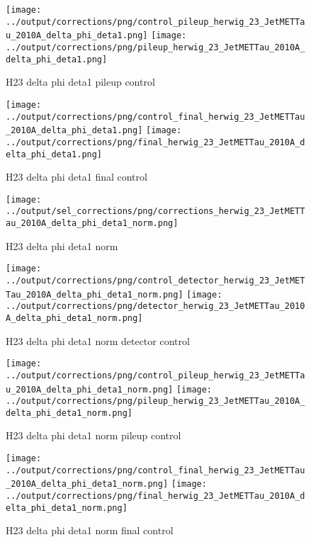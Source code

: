 \documentclass[11pt]{book}
\begin{document}
\begin{figure}[ht]
\centering
\texttt{[image: ../output/corrections/png/control\_pileup\_herwig\_23\_JetMETTau\_2010A\_delta\_phi\_deta1.png]}
\texttt{[image: ../output/corrections/png/pileup\_herwig\_23\_JetMETTau\_2010A\_delta\_phi\_deta1.png]}
\caption{H23 delta phi deta1 pileup control}
\label{fig:H23_JetMETTau_2010A_delta_phi_deta1_pileup_control}
\end{figure}


\begin{figure}[ht]
\centering
\texttt{[image: ../output/corrections/png/control\_final\_herwig\_23\_JetMETTau\_2010A\_delta\_phi\_deta1.png]}
\texttt{[image: ../output/corrections/png/final\_herwig\_23\_JetMETTau\_2010A\_delta\_phi\_deta1.png]}
\caption{H23 delta phi deta1 final control}
\label{fig:H23_JetMETTau_2010A_delta_phi_deta1_final_control}
\end{figure}


\begin{figure}[ht]
\centering
\texttt{[image: ../output/sel\_corrections/png/corrections\_herwig\_23\_JetMETTau\_2010A\_delta\_phi\_deta1\_norm.png]}
\caption{H23 delta phi deta1 norm}
\label{fig:H23_JetMETTau_2010A_delta_phi_deta1_norm}
\end{figure}

\begin{figure}[ht]
\centering
\texttt{[image: ../output/corrections/png/control\_detector\_herwig\_23\_JetMETTau\_2010A\_delta\_phi\_deta1\_norm.png]}
\texttt{[image: ../output/corrections/png/detector\_herwig\_23\_JetMETTau\_2010A\_delta\_phi\_deta1\_norm.png]}
\caption{H23 delta phi deta1 norm detector control}
\label{fig:H23_JetMETTau_2010A_delta_phi_deta1_norm_detector_control}
\end{figure}

\begin{figure}[ht]
\centering
\texttt{[image: ../output/corrections/png/control\_pileup\_herwig\_23\_JetMETTau\_2010A\_delta\_phi\_deta1\_norm.png]}
\texttt{[image: ../output/corrections/png/pileup\_herwig\_23\_JetMETTau\_2010A\_delta\_phi\_deta1\_norm.png]}
\caption{H23 delta phi deta1 norm pileup control}
\label{fig:H23_JetMETTau_2010A_delta_phi_deta1_norm_pileup_control}
\end{figure}


\begin{figure}[ht]
\centering
\texttt{[image: ../output/corrections/png/control\_final\_herwig\_23\_JetMETTau\_2010A\_delta\_phi\_deta1\_norm.png]}
\texttt{[image: ../output/corrections/png/final\_herwig\_23\_JetMETTau\_2010A\_delta\_phi\_deta1\_norm.png]}
\caption{H23 delta phi deta1 norm final control}
\label{fig:H23_JetMETTau_2010A_delta_phi_deta1_norm_final_control}
\end{figure}
\end{document}
